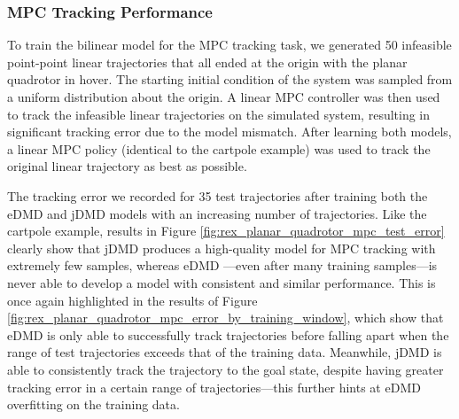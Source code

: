 \documentclass{article}
\begin{document}
      \subsubsection{MPC Tracking Performance}
      
      To train the bilinear model for the MPC tracking task, we generated 50 infeasible point-point
      linear trajectories that all ended at the origin with the planar quadrotor in hover. The starting
      initial condition of the system was sampled from a uniform distribution about the origin.
      A linear MPC controller was then used to track the infeasible linear trajectories on the
      simulated system, resulting in significant tracking error due to the model mismatch. 
      After learning both models, a linear MPC policy (identical to the cartpole example) was
      used to track the original linear trajectory as best as possible.
      
      The tracking error we recorded for 35 test trajectories after training both the eDMD 
      and jDMD models with an increasing number of trajectories. Like the cartpole example,
      results in Figure \ref{fig:rex_planar_quadrotor_mpc_test_error} clearly show that jDMD
      produces a high-quality model for MPC tracking with extremely few samples, whereas eDMD
      ---even after many training samples---is never able to develop a model with consistent
      and similar performance. This is once again highlighted
      in the results of Figure \ref{fig:rex_planar_quadrotor_mpc_error_by_training_window}, which
      show that eDMD is only able to successfully track trajectories before falling apart when the
      range of test trajectories exceeds that of the training data. Meanwhile, jDMD is able to consistently
      track the trajectory to the goal state, despite having greater tracking error in a certain range
      of trajectories---this further hints at eDMD overfitting on the training data.
      
\end{document}
